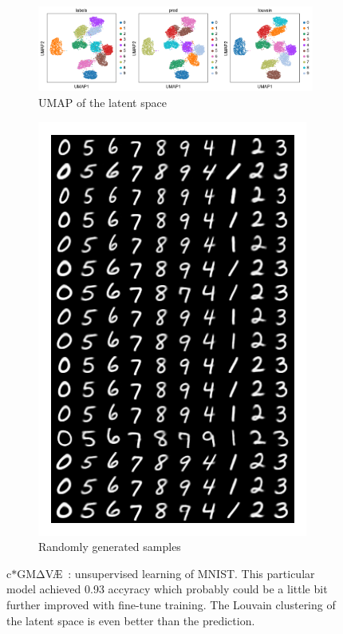 \documentclass[11pt, a4paper]{report}
\theoremstyle{plain}
\theoremstyle{definition}
\theoremstyle{remark}
\newcommand{\gmvae}{c$\ast$GM$\mathrm{\Delta}$V\AE~}
\begin{document}
\begin{figure}[h]
\centering
\begin{subfigure}[b]{1.01\textwidth}
\includegraphics[width=\textwidth]{images/gmmvae_mnist_us_latent_umap.png}
\caption{UMAP of the latent space}
\label{fig:mnist_us_latent}
\end{subfigure}
\begin{subfigure}[b]{0.3\textwidth}
\includegraphics[width=\textwidth]{images/gmmvae_mnist_us_samples2.png}
\caption{Randomly generated samples}
\label{fig:mnist_us_samples}
\end{subfigure}
\caption{\gmvae: unsupervised learning of MNIST. This particular model
achieved 0.93 accyracy which probably could be a little bit further
improved with fine-tune training. The Louvain clustering of the latent space is even better
than the prediction.}
\label{fig:mnist_us_10}
\end{figure}
\end{document}
